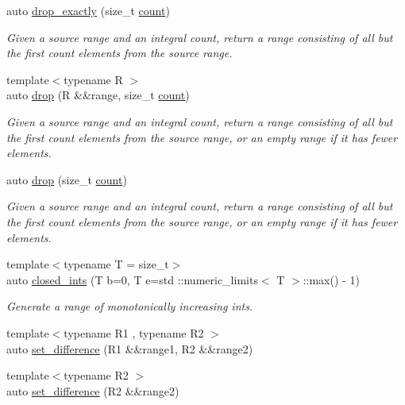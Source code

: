\begin{DoxyCompactItemize}
auto \mbox{\hyperlink{namespacerah_1_1view_a383766e5c4c363ff39ad92f174919667}{drop\+\_\+exactly}} (size\+\_\+t \mbox{\hyperlink{namespacerah_aa528865cc4a45d4eb276329554f16b4b}{count}})
\begin{DoxyCompactList}\small\item\em Given a source range and an integral count, return a range consisting of all but the first count elements from the source range. \end{DoxyCompactList}\item 
{\footnotesize template$<$typename R $>$ }\\auto \mbox{\hyperlink{namespacerah_1_1view_a1efbe9a7438d94b8c91a2904752ed8da}{drop}} (R \&\&range, size\+\_\+t \mbox{\hyperlink{namespacerah_aa528865cc4a45d4eb276329554f16b4b}{count}})
\begin{DoxyCompactList}\small\item\em Given a source range and an integral count, return a range consisting of all but the first count elements from the source range, or an empty range if it has fewer elements. \end{DoxyCompactList}\item 
auto \mbox{\hyperlink{namespacerah_1_1view_a410f314410afe512785c40e30c4f3111}{drop}} (size\+\_\+t \mbox{\hyperlink{namespacerah_aa528865cc4a45d4eb276329554f16b4b}{count}})
\begin{DoxyCompactList}\small\item\em Given a source range and an integral count, return a range consisting of all but the first count elements from the source range, or an empty range if it has fewer elements. \end{DoxyCompactList}\item 
{\footnotesize template$<$typename T  = size\+\_\+t$>$ }\\auto \mbox{\hyperlink{namespacerah_1_1view_a1f8c1c978aa638b078d9e81387d83c7c}{closed\+\_\+ints}} (T b=0, T e=std \+::numeric\+\_\+limits$<$ T $>$\+::max() -\/ 1)
\begin{DoxyCompactList}\small\item\em Generate a range of monotonically increasing ints. \end{DoxyCompactList}\item 
{\footnotesize template$<$typename R1 , typename R2 $>$ }\\auto \mbox{\hyperlink{namespacerah_1_1view_a84654eafe15215fce621133f069eefc4}{set\+\_\+difference}} (R1 \&\&range1, R2 \&\&range2)
\item 
{\footnotesize template$<$typename R2 $>$ }\\auto \mbox{\hyperlink{namespacerah_1_1view_a8b675093c1b9012369f071f5ba0fbee5}{set\+\_\+difference}} (R2 \&\&range2)
\end{DoxyCompactItemize}


